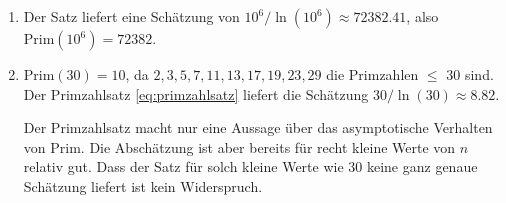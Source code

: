 \begin{Answer}
\begin{enumerate}[label=(\alph*)]
    \item Der Satz liefert eine Schätzung von $10^6 / \ln{(10^6)} \approx 72382.41$, also $\text{Prim}(10^6) = 72382$.
    \item $\text{Prim}(30) = 10$, da $2, 3, 5, 7, 11, 13, 17, 19, 23, 29$ die Primzahlen $\leq$ 30 sind.
Der Primzahlsatz \ref{eq:primzahlsatz} liefert die Schätzung $30 / \ln{(30)} \approx 8.82$.

Der Primzahlsatz macht nur eine Aussage über das asymptotische Verhalten von $\text{Prim}$. Die Abschätzung ist aber bereits für recht kleine Werte von $n$ relativ gut. Dass der Satz für solch kleine Werte wie $30$ keine ganz genaue Schätzung liefert ist kein Widerspruch.
\end{enumerate}
\end{Answer}

